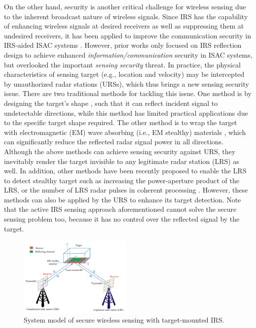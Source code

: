 \documentclass[10pt,final,doublecolumn]{IEEEtran}
\begin{document}
On the other hand, security is another critical challenge for wireless sensing due to the inherent broadcast nature of wireless signals. Since IRS
has the capability of enhancing wireless
signals at desired receivers as well as suppressing them at undesired receivers, it has been applied to improve the communication security in IRS-aided ISAC systems \cite{qings,seuliu}. However, prior works only focused on IRS reflection design to achieve enhanced 
{\it information/communication} security in ISAC systems, but overlooked the important {\it sensing security} threat. In practice, the physical characteristics of sensing target (e.g., location and velocity) may be intercepted by unauthorized radar stations (URSs), which thus brings a new sensing security issue. There are two traditional methods for tackling this issue. One method is by designing the target's shape \cite{shape}, such that it can reflect incident signal to undetectable directions, while this method has limited practical applications due to the specific target shape required. The other method is to wrap the target with  electromagnetic (EM) wave absorbing (i.e., EM stealthy) materials \cite{stealth}, which can significantly reduce the reflected radar signal power in all directions. Although the above methods can achieve sensing security against URS, they inevitably render the target invisible to any legitimate radar station (LRS) as well. In addition, other methods have been recently proposed to enable the LRS to detect stealthy target such as increasing the power-aperture product of the LRS, or the number of LRS radar pulses in coherent processing \cite{PA}. However, these methods can also be applied by the URS to enhance its target detection. Note that the active IRS sensing approach \cite{shaos,shaos1} aforementioned cannot solve the secure sensing problem too, because it has no control over the reflected signal by the target.
\begin{figure}[t]
\setlength{\abovecaptionskip}{-0.cm}
\setlength{\belowcaptionskip}{0.cm}
  \centering
\includegraphics [width=0.49\textwidth] {sys_model.pdf}
\caption{System model of secure wireless sensing with target-mounted IRS.}
\label{sys_model}
\end{figure}
\end{document}

